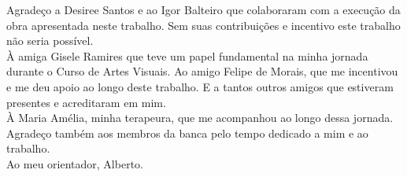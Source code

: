 \begin{agradecimento}

Agradeço a Desiree Santos e ao Igor Balteiro que colaboraram com a execução da obra apresentada neste trabalho. Sem suas contribuições e incentivo este trabalho não seria possível.\\

À amiga Gisele Ramires que teve um papel fundamental na minha jornada durante o Curso de Artes Visuais. Ao amigo Felipe de Morais, que me incentivou e me deu apoio ao longo deste trabalho. E a tantos outros amigos que estiveram presentes e acreditaram em mim.\\


À Maria Amélia, minha terapeura, que me acompanhou ao longo dessa jornada.\\


Agradeço também aos membros da banca pelo tempo dedicado a mim e ao trabalho.\\


Ao meu orientador, Alberto.\\

\end{agradecimento}